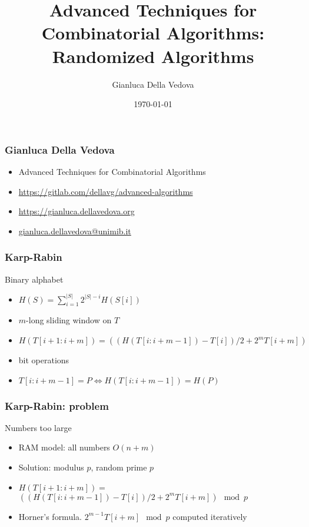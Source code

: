 \documentclass[12pt,aspectratio=169]{beamer}
\author{Gianluca Della Vedova}
\title[Advanced Algorithms]{Advanced Techniques for Combinatorial Algorithms:
Randomized Algorithms}
\institute[]{Univ. Milano--Bicocca\\
  \texttt{https://gianluca.dellavedova.org}}
\date[]{{\tiny \today\hspace{1em}}}
\begin{document}
\begin{frame}
  \titlepage
\end{frame}


\begin{frame}\frametitle{Gianluca Della Vedova}
  \begin{itemize}
  \item
                Advanced Techniques for Combinatorial Algorithms
\item
{\small\url{https://gitlab.com/dellavg/advanced-algorithms}}
  \item
{\small\url{https://gianluca.dellavedova.org}}
  \item
{\small\url{gianluca.dellavedova@unimib.it}}
  \end{itemize}
\end{frame}

\begin{frame}[fragile]
\frametitle{Karp-Rabin}
\begin{block}{Binary alphabet}
\begin{itemize}
\item
$H(S)=\sum_{i=1}^{|S|} 2^{|S| - i}H(S[i])$
\item
$m$-long sliding window on $T$
\item
$H(T[i+1:i+m]) = \left(\left(H(T[i:i+m-1]) - T[i] \right) / 2 + 2^{m}T[i+m] \right)$
\item
bit operations
\item
$T[i:i+m-1]=P \Leftrightarrow H(T[i:i+m-1])=H(P)$
\end{itemize}
\end{block}
\end{frame}

\begin{frame}[fragile]
\frametitle{Karp-Rabin: problem}
\begin{block}{Numbers too large}
\begin{itemize}
\item
RAM model: all numbers $O(n+m)$
\item
Solution: modulus $p$, random prime $p$
\item
$H(T[i+1:i+m]) =$\\
$\left(\left(H(T[i:i+m-1]) - T[i] \right) / 2 + 2^{m}T[i+m] \right)\mod p$
\item
Horner's formula.
%
$2^{m-1}T[i+m] \mod p$ computed iteratively
\end{itemize}
\end{block}
\end{frame}
\end{document}
